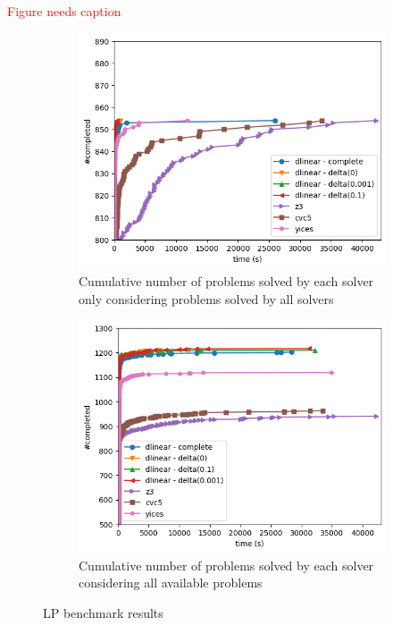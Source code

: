 \documentclass[runningheads]{llncs}
\begin{document}
\textcolor{red}{Figure needs caption}
\begin{figure}[H]
    \centering
    \begin{subfigure}{.46\textwidth}
        \centering
        \includegraphics[width=\linewidth]{img/on_file_lp.png}
        \caption{Cumulative number of problems solved by each solver only considering  problems solved by all solvers}
        \label{fig:results-lp1}
    \end{subfigure}%
    \hspace{1cm}
    \begin{subfigure}{.45\textwidth}
        \centering
        \includegraphics[width=\linewidth]{img/total_lp.png}
        \caption{Cumulative number of problems solved by each solver considering all available problems}
        \label{fig:results-lp2}
    \end{subfigure}
    \caption{LP benchmark results}
\end{figure}
\end{document}
